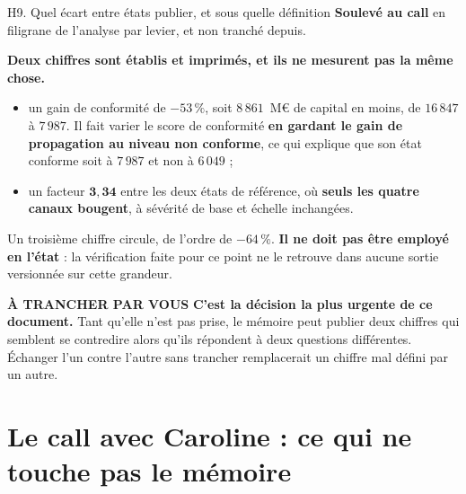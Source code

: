 \documentclass[11pt]{beamer}
\newcommand{\atrancher}{\textbf{À TRANCHER PAR VOUS}}
\newcommand{\srcs}[1]{\vspace{0.8mm}{\tiny\textcolor{gray!50!black}{Sources : #1}}}
\begin{document}
\begin{frame}{H9. Quel écart entre états publier, et sous quelle définition}
\scriptsize
\textbf{Soulevé au call} en filigrane de l'analyse par levier, et non tranché depuis.
\vspace{1mm}

\textbf{Deux chiffres sont établis et imprimés, et ils ne mesurent pas la même chose.}
\begin{itemize}\itemsep1pt
\item un gain de conformité de $-53\,\%$, soit $8\,861$~M\euro{} de capital en moins, de
$16\,847$ à $7\,987$. Il fait varier le score de conformité \textbf{en gardant le gain de
propagation au niveau non conforme}, ce qui explique que son état \og conforme \fg{} soit à
$7\,987$ et non à $6\,049$ ;
\item un facteur $\mathbf{3{,}34}$ entre les deux états de référence, où \textbf{seuls les
quatre canaux bougent}, à sévérité de base et échelle inchangées.
\end{itemize}
\vspace{1mm}
Un troisième chiffre circule, de l'ordre de $-64\,\%$. \textbf{Il ne doit pas être employé en
l'état} : la vérification faite pour ce point ne le retrouve dans aucune sortie versionnée sur
cette grandeur.
\begin{block}{\atrancher}
\textbf{C'est la décision la plus urgente de ce document.} Tant qu'elle n'est pas prise, le
mémoire peut publier deux chiffres qui semblent se contredire alors qu'ils répondent à deux
questions différentes. Échanger l'un contre l'autre sans trancher remplacerait un chiffre mal
défini par un autre.
\end{block}
\srcs{scripts~\texttt{25} et~\texttt{43}}
\end{frame}

\section*{Le call avec Caroline : ce qui ne touche pas le mémoire}
\end{document}
